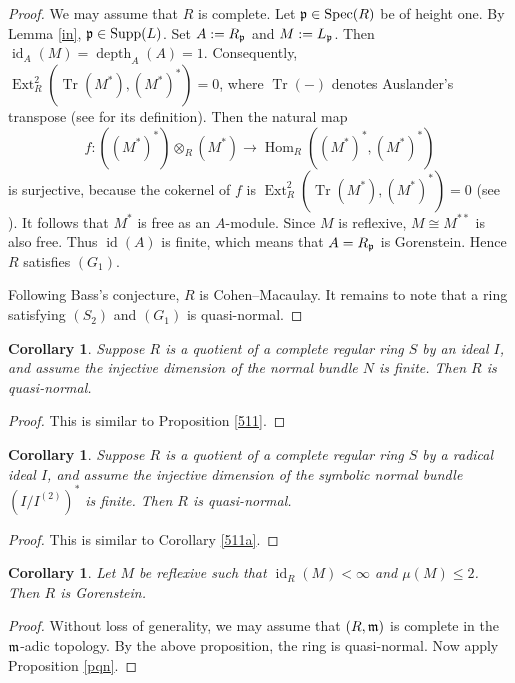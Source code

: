 \documentclass[10. pt,a4paper]{amsart}
\newtheorem{corollary}[theorem]{Corollary}
\theoremstyle{definition}
\theoremstyle{remark}
\newcommand{\Spec}{\operatorname{Spec}}
\newcommand{\Tr}{\operatorname{Tr}}
\newcommand{\id}{\operatorname{id}}
\newcommand{\Ext}{\operatorname{Ext}}
\newcommand{\Supp}{\operatorname{Supp}}
\newcommand{\Hom}{\operatorname{Hom}}
\newcommand{\depth}{\operatorname{depth}}
\newcommand{\fm}{\frak{m}}
\newcommand{\fp}{\frak{p}}
\begin{document}
\begin{proof}
	We may assume that $R$ is complete. Let $\fp \in \Spec(R)$ be of height one. By Lemma \ref{in}, $\fp \in \Supp(L)$. Set $A := R_{\fp}$ and $M := L_{\fp}$. Then $\id_A(M) = \depth_A(A) = 1$. Consequently, $\Ext_R^2(\Tr(M^\ast), (M^\ast)^\ast) = 0$, where $\Tr(-)$ denotes Auslander's transpose (see \cite{AB2} for its definition). Then the natural map
	\[
	f : ((M^\ast)^\ast) \otimes_R (M^\ast) \longrightarrow \Hom_R((M^\ast)^\ast, (M^\ast)^\ast)
	\]
	is surjective, because the cokernel of $f$ is $\Ext_R^2(\Tr(M^\ast), (M^\ast)^\ast) = 0$ (see \cite[Proposition (2.6)(a)]{AB2}). It follows that $M^\ast$ is free as an $A$-module. Since $M$ is reflexive, $M \cong M^{\ast\ast}$ is also free. Thus $\id(A)$ is finite, which means that $A = R_{\fp}$ is Gorenstein. Hence $R$ satisfies $(G_1)$.
	
	Following Bass's conjecture, $R$ is Cohen--Macaulay. It remains to note that a ring satisfying $(S_2)$ and $(G_1)$ is quasi-normal.
\end{proof}

\begin{corollary}	
	Suppose $R$ is a quotient of a complete regular ring $S$ by an ideal $I$, and assume the injective dimension of the normal bundle $N$ is finite. Then $R$ is quasi-normal.
\end{corollary}

\begin{proof}
	This is similar to Proposition \ref{511}.
\end{proof}
\begin{corollary}	
Suppose $R$ is a quotient of a complete regular ring $S$ by a radical ideal $I$, and assume the injective dimension of the symbolic normal bundle $(I/I^{(2)})^\ast$ is finite. Then $R$ is quasi-normal.
\end{corollary}

\begin{proof}
This is similar to {Corollary}  \ref{511a}.
\end{proof}

\begin{corollary}
	Let $M$ be reflexive such that $\id_R(M) < \infty$ and $\mu(M) \leq 2$. Then $R$ is Gorenstein.
\end{corollary}

\begin{proof}
	Without loss of generality, we may assume that $(R,\fm)$ is complete in the $\fm$-adic topology. By the above proposition, the ring is quasi-normal. Now apply Proposition \ref{pqn}.
\end{proof}
\end{document}

